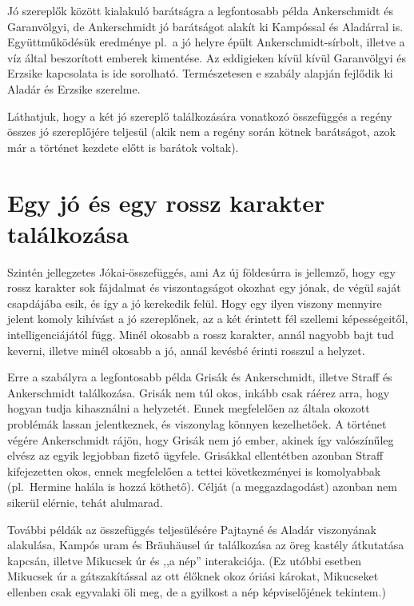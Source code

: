 \documentclass{thesis-ekf}
\begin{document}
    Jó szereplők között kialakuló barátságra a legfontosabb példa Ankerschmidt és Garanvölgyi,
        de Ankerschmidt jó barátságot alakít ki Kampóssal és Aladárral is.
    Együttműködésük eredménye pl.~a jó helyre épült Ankerschmidt-sírbolt, illetve a víz által beszorított emberek kimentése.
    Az eddigieken kívül kívül Garanvölgyi és Erzsike kapcsolata is ide sorolható.
    Természetesen e szabály alapján fejlődik ki Aladár és Erzsike szerelme.

    Láthatjuk, hogy a két jó szereplő találkozására vonatkozó összefüggés a regény összes jó szereplőjére teljesül
        (akik nem a regény során kötnek barátságot, azok már a történet kezdete előtt is barátok voltak).

    \section{Egy jó és egy rossz karakter találkozása}\label{sec:egy-jo-es-egy-rossz-karakter-talalkozasa}

    Szintén jellegzetes Jókai-összefüggés, ami Az új földesúrra is jellemző, hogy egy rossz karakter
        sok fájdalmat és viszontagságot okozhat egy jónak, de végül saját csapdájába esik, és így a jó kerekedik felül.
    Hogy egy ilyen viszony mennyire jelent komoly kihívást a jó szereplőnek, az a két érintett fél szellemi képességeitől,
        intelligenciájától függ.
    Minél okosabb a rossz karakter, annál nagyobb bajt tud keverni, illetve minél okosabb a jó,
        annál kevésbé érinti rosszul a helyzet.

    Erre a szabályra a legfontosabb példa Grisák és Ankerschmidt, illetve Straff és Ankerschmidt találkozása.
        Grisák nem túl okos, inkább csak ráérez arra, hogy hogyan tudja kihasználni a helyzetét.
    Ennek megfelelően az általa okozott problémák lassan jelentkeznek, és viszonylag könnyen kezelhetőek.
    A történet végére Ankerschmidt rájön, hogy Grisák nem jó ember, akinek így valószínűleg elvész az egyik
        legjobban fizető ügyfele.
    Grisákkal ellentétben azonban Straff kifejezetten okos, ennek megfelelően a tettei következményei is komolyabbak
        (pl.~Hermine halála is hozzá köthető).
    Célját (a meggazdagodást) azonban nem sikerül elérnie, tehát alulmarad.

    További példák az összefüggés teljesülésére Pajtayné és Aladár viszonyának alakulása, Kampós uram és
        Bräuhäusel úr találkozása az öreg kastély átkutatása kapcsán, illetve Mikucsek úr és ,,a nép'' interakciója.
    (Ez utóbbi esetben Mikucsek úr a gátszakítással az ott élőknek okoz óriási károkat, Mikucseket ellenben csak
        egyvalaki öli meg, de a gyilkost a nép képviselőjének tekintem.)
\end{document}
